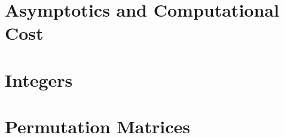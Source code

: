\documentclass[12pt,a4paper]{book}
\theoremstyle{definition}
\begin{document}
\appendix

\chapter{Asymptotics and Computational Cost}


\chapter{Integers}


\chapter{Permutation Matrices}

\end{document}
